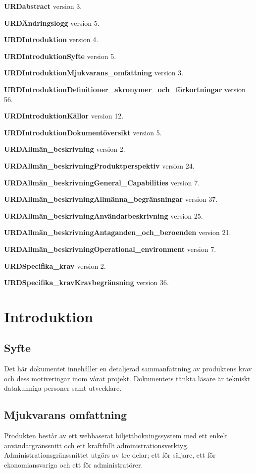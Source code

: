 \documentclass[a4paper, twoside, 11pt, titlepage]{article}
\begin{document}
\textbf{URDabstract} version 3.

\textbf{URDÄndringslogg} version 5.

\textbf{URDIntroduktion} version 4.

\textbf{URDIntroduktionSyfte} version 5.

\textbf{URDIntroduktionMjukvarans\_omfattning} version 3.

\textbf{URDIntroduktionDefinitioner\_akronymer\_och\_förkortningar} version 56.

\textbf{URDIntroduktionKällor} version 12.

\textbf{URDIntroduktionDokumentöversikt} version 5.

\textbf{URDAllmän\_beskrivning} version 2.

\textbf{URDAllmän\_beskrivningProduktperspektiv} version 24.

\textbf{URDAllmän\_beskrivningGeneral\_Capabilities} version 7.

\textbf{URDAllmän\_beskrivningAllmänna\_begränsningar} version 37.

\textbf{URDAllmän\_beskrivningAnvändarbeskrivning} version 25.

\textbf{URDAllmän\_beskrivningAntaganden\_och\_beroenden} version 21.

\textbf{URDAllmän\_beskrivningOperational\_environment} version 7.

\textbf{URDSpecifika\_krav} version 2.

\textbf{URDSpecifika\_kravKravbegränsning} version 36.

\clearpage
	\section{Introduktion}



	\subsection{Syfte}


	Det här dokumentet innehåller en detaljerad sammanfattning av produktens krav och dess motiveringar inom vårat projekt. Dokumentets tänkta läsare är tekniskt datakunniga personer samt utvecklare.

	\subsection{Mjukvarans omfattning}


	Produkten består av ett webbaserat biljettbokningssystem med ett enkelt användargränssnitt och ett kraftfullt administrationsverktyg. Administrationsgränssnittet utgörs av tre delar; ett för säljare, ett för ekonomiansvariga och ett för administratörer.
\end{document}
